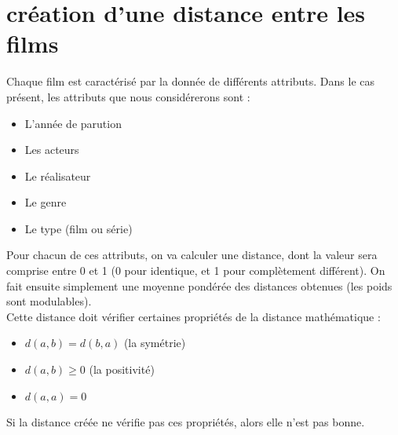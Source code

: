 \documentclass{report}
\begin{document}
\section{création d'une distance entre les films}
Chaque film est caractérisé par la donnée de différents attributs. Dans le cas présent, les attributs que nous considérerons sont :
\begin{itemize}
    \item L'année de parution
    \item Les acteurs
    \item Le réalisateur
    \item Le genre
    \item Le type (film ou série)
\end{itemize}
Pour chacun de ces attributs, on va calculer une distance, dont la valeur sera comprise entre 0 et 1 (0 pour identique, et 1 pour complètement différent). On fait ensuite simplement une moyenne pondérée des distances obtenues (les poids sont modulables).\\
Cette distance doit vérifier certaines propriétés de la distance mathématique :
\begin{itemize}
    \item \(d(a,b)=d(b,a)\) (la symétrie)
    \item \(d(a,b) \geq 0\) (la positivité)
    \item \(d(a,a)=0\)
\end{itemize}
Si la distance créée ne vérifie pas ces propriétés, alors elle n'est pas bonne.
\end{document}
